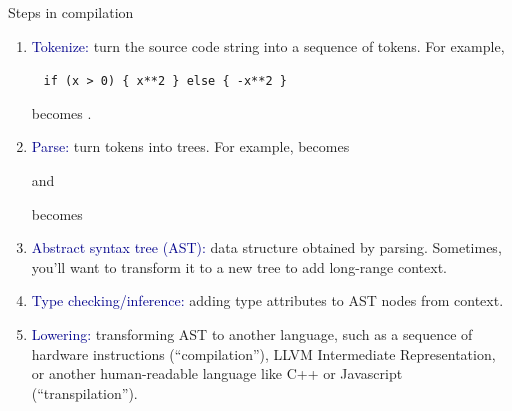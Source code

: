 \documentclass[aspectratio=169]{beamer}
\begin{document}
\begin{frame}{Steps in compilation}
\vspace{0.35 cm}

\begin{enumerate}
\item \textcolor{darkblue}{Tokenize:} turn the source code string into a sequence of tokens. For example,

\vspace{0.15 cm}
\mbox{ } \hfill \texttt{\small if (x > 0) \{ x**2 \} else \{ -x**2 \}} \hfill \mbox{ }

\vspace{0.15 cm}
becomes  \fbox{\texttt{\scriptsize (}}  \fbox{\texttt{\scriptsize >}}  \fbox{\texttt{\scriptsize )}} \fbox{\texttt{\scriptsize \{}}  \fbox{\texttt{\scriptsize **}}  \fbox{\texttt{\scriptsize \}}}  \fbox{\texttt{\scriptsize \{}} \fbox{\texttt{\scriptsize -}}  \fbox{\texttt{\scriptsize **}}  \fbox{\texttt{\scriptsize \}}}.

\item \textcolor{darkblue}{Parse:} turn tokens into trees. For example,  \fbox{\texttt{\scriptsize **}}  becomes and

 \fbox{\scriptsize\{}  \fbox{\scriptsize\}}  \fbox{\scriptsize\{}  \fbox{\scriptsize\}} becomes

\item \textcolor{darkblue}{Abstract syntax tree (AST):} data structure obtained by parsing. Sometimes, you'll want to transform it to a new tree to add long-range context.

\item \textcolor{darkblue}{Type checking/inference:} adding type attributes to AST nodes from context.

\item \textcolor{darkblue}{Lowering:} transforming AST to another language, such as a sequence of hardware instructions (``compilation''), LLVM Intermediate Representation, or another human-readable language like C++ or Javascript (``transpilation'').
\end{enumerate}
\end{frame}
\end{document}
